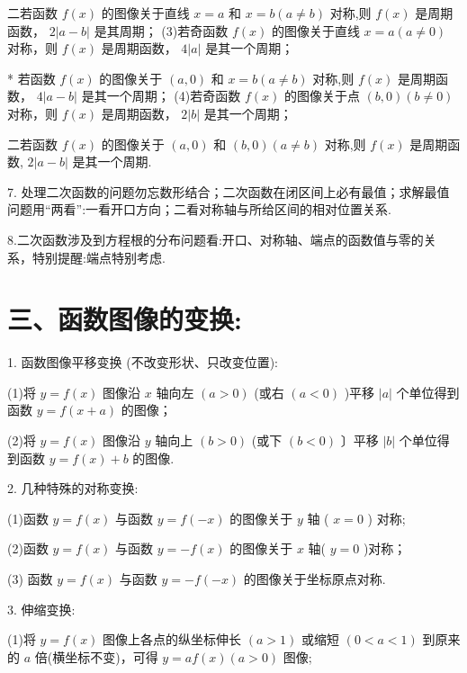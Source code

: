 二若函数 $f\left( x\right)$ 的图像关于直线 $x = a$ 和 $x = b\left( {a \neq  b}\right)$ 对称,则 $f\left( x\right)$ 是周期函数， $2\left| {a - b}\right|$ 是其周期； (3)若奇函数 $f\left( x\right)$ 的图像关于直线 $x = a\left( {a \neq  0}\right)$ 对称，则 $f\left( x\right)$ 是周期函数， $4\left| a\right|$ 是其一个周期；

* 若函数 $f\left( x\right)$ 的图像关于 $\left( {a,0}\right)$ 和 $x = b\left( {a \neq  b}\right)$ 对称,则 $f\left( x\right)$ 是周期函数， $4\left| {a - b}\right|$ 是其一个周期； (4)若奇函数 $f\left( x\right)$ 的图像关于点 $\left( {b,0}\right) \left( {b \neq  0}\right)$ 对称，则 $f\left( x\right)$ 是周期函数， $2\left| b\right|$ 是其一个周期；

二若函数 $f\left( x\right)$ 的图像关于 $\left( {a,0}\right)$ 和 $\left( {b,0}\right) \left( {a \neq  b}\right)$ 对称,则 $f\left( x\right)$ 是周期函数, $2\left| {a - b}\right|$ 是其一个周期.

7. 处理二次函数的问题勿忘数形结合；二次函数在闭区间上必有最值；求解最值问题用“两看”:一看开口方向；二看对称轴与所给区间的相对位置关系.

8.二次函数涉及到方程根的分布问题看:开口、对称轴、端点的函数值与零的关系，特别提醒:端点特别考虑.

\section*{三、函数图像的变换:}

1. 函数图像平移变换 (不改变形状、只改变位置):

(1)将 $y = f\left( x\right)$ 图像沿 $x$ 轴向左 $\left( {a > 0}\right)$ (或右 $\left( {a < 0}\right)$ )平移 $\left| a\right|$ 个单位得到函数 $y = f\left( {x + a}\right)$ 的图像；

(2)将 $y = f\left( x\right)$ 图像沿 $y$ 轴向上 $\left( {b > 0}\right)$ (或下 $\left( {b < 0}\right)$ 〕平移 $\left| b\right|$ 个单位得到函数 $y = f\left( x\right)  + b$ 的图像.

2. 几种特殊的对称变换:

(1)函数 $y = f\left( x\right)$ 与函数 $y = f\left( {-x}\right)$ 的图像关于 $y$ 轴 ( $x = 0$ ) 对称;

(2)函数 $y = f\left( x\right)$ 与函数 $y =  - f\left( x\right)$ 的图像关于 $x$ 轴( $y = 0$ )对称；

(3) 函数 $y = f\left( x\right)$ 与函数 $y =  - f\left( {-x}\right)$ 的图像关于坐标原点对称.

3. 伸缩变换:

(1)将 $y = f\left( x\right)$ 图像上各点的纵坐标伸长 $\left( {a > 1}\right)$ 或缩短 $\left( {0 < a < 1}\right)$ 到原来的 $a$ 倍(横坐标不变)，可得 $y  = {af}\left( x\right) \left( {a > 0}\right)$ 图像;

